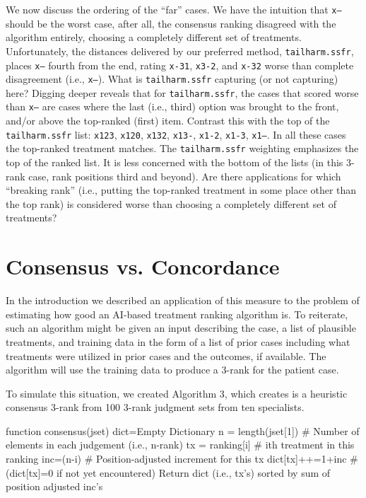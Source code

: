 \documentclass{article}
\begin{document}
We now discuss the ordering of the ``far'' cases. We have the intuition that \texttt{x---} should be the worst case, after all, the consensus ranking disagreed with the algorithm entirely, choosing a completely different set of treatments. Unfortunately, the distances delivered by our preferred method, \texttt{tailharm.ssfr}, places \texttt{x---} fourth from the end, rating \texttt{x-31}, \texttt{x3-2}, and \texttt{x-32} worse than complete disagreement (i.e., \texttt{x---}). What is \texttt{tailharm.ssfr} capturing (or not capturing) here? Digging deeper reveals that for \texttt{tailharm.ssfr}, the cases that scored worse than \texttt{x---} are cases where the last (i.e., third) option was brought to the front, and/or above the top-ranked (first) item. Contrast this with the top of the \texttt{tailharm.ssfr} list: \texttt{x123}, \texttt{x120}, \texttt{x132}, \texttt{x13-}, \texttt{x1-2}, \texttt{x1-3}, \texttt{x1--}. In all these cases the top-ranked treatment matches. The \texttt{tailharm.ssfr} weighting emphasizes the top of the ranked list. It is less concerned with the bottom of the lists (in this 3-rank case, rank positions third and beyond).  Are there applications for which ``breaking rank'' (i.e., putting the top-ranked treatment in some place other than the top rank) is considered worse than choosing a completely different set of treatments?  

\section{Consensus vs. Concordance}

In the introduction we described an application of this measure to the problem of estimating how good an AI-based treatment ranking algorithm is. To reiterate, such an algorithm might be given an input describing the case, a list of plausible treatments, and training data in the form of a list of prior cases including what treatments were utilized in prior cases and the outcomes, if available. The algorithm will use the training data to produce a 3-rank for the patient case. 

To simulate this situation, we created Algorithm 3, which creates is a heuristic consensus 3-rank from 100 3-rank judgment sets from ten specialists. 

\begin{algorithm}
	\caption{$Consensus(JudgmentSet)$}
	\begin{algorithmic}[1]
\State function consensus(jset)
    \State dict=Empty Dictionary
    \State n = length(jset[1]) \# Number of elements in each judgement (i.e., n-rank)
            \State tx = ranking[i] \# ith treatment in this ranking
            \State inc=(n-i) \# Position-adjusted increment for this tx
            \State dict[tx]++=1+inc \# (dict[tx]=0 if not yet encountered)
        \EndFor
    \EndFor
    \State Return dict (i.e., tx's) sorted by sum of position adjusted inc's
	\end{algorithmic} 
\end{algorithm} 
\end{document}
